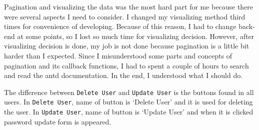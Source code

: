 Pagination and visualizing the data was the most hard part for me because there were several aspects I need to consider. I changed my visualizing method third times for convenience of developing. Because of this reason, I had to change back-end at some points, so I lost so much time for visualizing decision. However, after visualizing decision is done, my job is not done because pagination is a little bit harder than I expected. Since I misunderstood some parts and concepts of pagination and its callback functions, I had to spent a couple of hours to search and read the antd documentation. In the end, I understood what I should do.

The difference between \texttt{Delete User} and \texttt{Update User} is the buttons found in all users. In \texttt{Delete User}, name of button is `Delete User' and it is used for deleting the user. In \texttt{Update User}, name of button is `Update User' and when it is clicked password update form is appeared.

